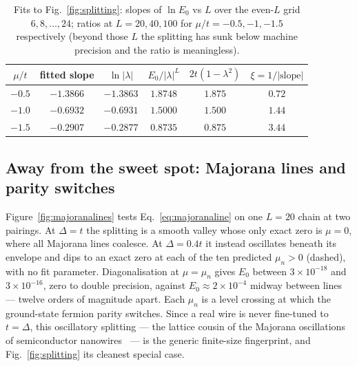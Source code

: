 \begin{table}[tb]
  \centering\small
  \caption{Fits to Fig.~\ref{fig:splitting}: slopes of $\ln E_0$ vs $L$ over the
  even-$L$ grid $6,8,\dots,24$; ratios at $L = 20,40,100$ for
  $\mu/t = -0.5,-1,-1.5$ respectively (beyond those $L$ the splitting has sunk
  below machine precision and the ratio is meaningless).}
  \label{tab:fits}
  \begin{tabular}{cccccc}
    \toprule
    $\mu/t$ & fitted slope & $\ln|\lambda|$ & $E_0/|\lambda|^{L}$ &
    $2t(1-\lambda^2)$ & $\xi = 1/|\mathrm{slope}|$ \\
    \midrule
    $-0.5$ & $-1.3866$ & $-1.3863$ & $1.8748$ & $1.875$ & $0.72$ \\
    $-1.0$ & $-0.6932$ & $-0.6931$ & $1.5000$ & $1.500$ & $1.44$ \\
    $-1.5$ & $-0.2907$ & $-0.2877$ & $0.8735$ & $0.875$ & $3.44$ \\
    \bottomrule
  \end{tabular}
\end{table}

\subsection{Away from the sweet spot: Majorana lines and parity switches}
\label{sec:oscillations}
Figure~\ref{fig:majoranalines} tests Eq.~\eqref{eq:majoranaline} on one
$L = 20$ chain at two pairings. At $\Delta = t$ the splitting is a smooth
valley whose only exact zero is $\mu = 0$, where all Majorana lines coalesce.
At $\Delta = 0.4t$ it instead oscillates beneath its envelope and dips to an
exact zero at each of the ten predicted $\mu_n > 0$ (dashed), with no fit
parameter.
Diagonalisation at $\mu = \mu_n$ gives $E_0$ between $3\times10^{-18}$ and
$3\times10^{-16}$, zero to double precision, against
$E_0 \approx 2 \times 10^{-4}$ midway between lines --- twelve orders of
magnitude apart. Each $\mu_n$ is a level crossing at which the ground-state
fermion parity switches. Since a real wire is never fine-tuned to
$t = \Delta$, this oscillatory splitting --- the lattice cousin of the
Majorana oscillations of semiconductor nanowires~\cite{dassarma2012} --- is
the generic finite-size fingerprint, and Fig.~\ref{fig:splitting} its cleanest
special case.

